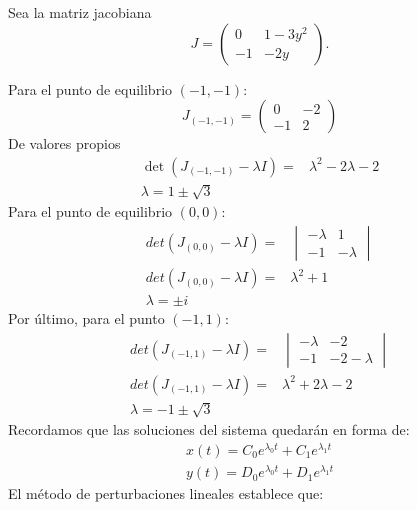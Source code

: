 \documentclass[../portafolio.tex]{subfiles}
\begin{document}
Sea la matriz jacobiana 
\[ 
J
= 
\begin{pmatrix} 
0 & 1-3y^2  \\ 
-1  & -2y  
\end{pmatrix} 
.
\]

Para el punto de equilibrio $(-1, -1)$:
\[ 
J_{(-1,-1)}
= 
\begin{pmatrix} 
0 & -2  \\ 
-1  & 2  
\end{pmatrix} 
\]
De valores propios
\begin{align}
\det(J_{(-1,-1)}-\lambda I) =& \lambda^2 -2\lambda - 2\\
\lambda= 1 \pm \sqrt{3}
\end{align}
Para el punto de equilibrio $(0,0)$:
\begin{align}
det(J_{(0,0)}-\lambda I) =& 
\begin{vmatrix}
-\lambda & 1 \\
-1 & -\lambda
\end{vmatrix}\\
det(J_{(0,0)}-\lambda I) =& \lambda^2 +1\\
\lambda=\pm i
\end{align}
Por último, para el punto $(-1,1)$:
\begin{align}
det(J_{(-1,1)}-\lambda I) =& 
\begin{vmatrix}
-\lambda & -2 \\
-1 & -2-\lambda
\end{vmatrix}\\
det(J_{(-1,1)}-\lambda I) =& \lambda^2 +2\lambda-2\\
\lambda= -1 \pm \sqrt{3}
\end{align}
Recordamos que las soluciones del sistema quedarán en forma de:
\begin{align}\label{g4_ej10:xx0}
x(t)=C_0 e^{\lambda_0 t} + C_1 e^{\lambda_1 t}\\ 
y(t)=D_0 e^{\lambda_0 t} + D_1 e^{\lambda_1 t} \label{g4_ej10:yy0}
\end{align}
El método de perturbaciones lineales \citep{strogatz,guia_edos} establece que:
\end{document}
